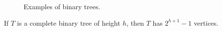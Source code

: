 \begin{figure}[!htbp]
\centering
{}
\qquad
{}
\qquad
{}
\qquad
{}
\caption{Examples of binary trees.}
\label{fig:trees_forests:examples_binary_trees}
\end{figure}

\begin{theorem}
\label{thm:trees_forests:complete_binary_tree_exact_order}
If $T$ is a complete binary tree of height
$h$, then $T$ has $2^{h+1} - 1$ vertices.
\end{theorem}

